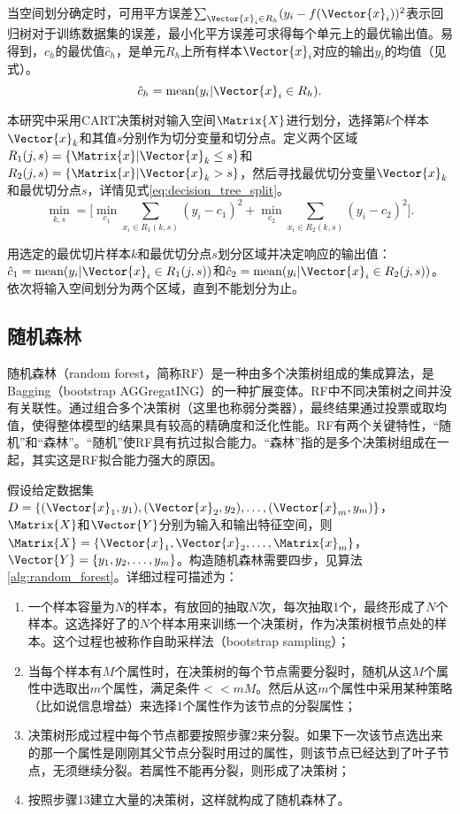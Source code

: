 当空间划分确定时，可用平方误差$\sum_{\Vector{x}_i\in R_h}(y_i-f(\Vector{x}_i))^2$表示回归树对于训练数据集的误差，最小化平方误差可求得每个单元上的最优输出值。易得到，$c_h$的最优值$\hat{c}_h$，是单元$R_h$上所有样本$\Vector{x}_i$对应的输出$y_i$的均值（见式）。
\begin{equation}
  \label{eq:decision_tree_unit}
  \hat{c}_h=\text{mean}(y_i|\Vector{x}_i\in R_h).
\end{equation}

本研究中采用CART决策树对输入空间$\Matrix{X}$进行划分，选择第$k$个样本$\Vector{x}_k$和其值$s$分别作为切分变量和切分点。定义两个区域$R_1(j,s)=\{\Matrix{x}|\Vector{x}_k\le s\}$和$R_2(j,s)=\{\Matrix{x}|\Vector{x}_k>s\}$，然后寻找最优切分变量$\Vector{x}_k$和最优切分点$s$，详情见式\ref{eq:decision_tree_split}。
\begin{equation}
  \label{eq:decision_tree_split}
  \min_{k,s}=\Bigg[\min_{c_1}^{}\sum_{x_i\in R_1(k,s)}(y_i-c_1)^2+\min_{c_2}^{}\sum_{x_i\in R_2(k,s)}(y_i-c_2)^2\Bigg].
\end{equation}

用选定的最优切片样本$k$和最优切分点$s$划分区域并决定响应的输出值：$\hat{c}_1=\text{mean}(y_i|\Vector{x}_i\in R_1(j,s))$和$\hat{c}_2=\text{mean}(y_i|\Vector{x}_i\in R_2(j,s))$。依次将输入空间划分为两个区域，直到不能划分为止。


\subsection{随机森林}\label{sec:随机森林}
随机森林（random forest，简称RF）是一种由多个决策树组成的集成算法，是Bagging（bootstrap AGGregatING）的一种扩展变体。RF中不同决策树之间并没有关联性。通过组合多个决策树（这里也称弱分类器），最终结果通过投票或取均值，使得整体模型的结果具有较高的精确度和泛化性能。RF有两个关键特性，``随机''和``森林''。``随机''使RF具有抗过拟合能力。``森林''指的是多个决策树组成在一起，其实这是RF拟合能力强大的原因。

假设给定数据集$D=\{(\Vector{x}_1,y_1),(\Vector{x}_2,y_2),\ldots,(\Vector{x}_m,y_m)\}$，$\Matrix{X}$和$\Vector{Y}$分别为输入和输出特征空间，则$\Matrix{X}=\{\Vector{x}_1,\Vector{x}_2,\ldots,\Matrix{x}_m\}$，$\Vector{Y}=\{y_1,y_2,\ldots,y_m\}$。构造随机森林需要四步，见算法\ref{alg:random_forest}。详细过程可描述为：

\begin{enumerate}
\item 一个样本容量为$N$的样本，有放回的抽取$N$次，每次抽取1个，最终形成了$N$个样本。这选择好了的$N$个样本用来训练一个决策树，作为决策树根节点处的样本。这个过程也被称作自助采样法（bootstrap sampling）；
\item 当每个样本有$M$个属性时，在决策树的每个节点需要分裂时，随机从这$M$个属性中选取出$m$个属性，满足条件$<<mM$。然后从这$m$个属性中采用某种策略（比如说信息增益）来选择1个属性作为该节点的分裂属性；
\item 决策树形成过程中每个节点都要按照步骤2来分裂。如果下一次该节点选出来的那一个属性是刚刚其父节点分裂时用过的属性，则该节点已经达到了叶子节点，无须继续分裂。若属性不能再分裂，则形成了决策树；
\item 按照步骤13建立大量的决策树，这样就构成了随机森林了。
\end{enumerate}

